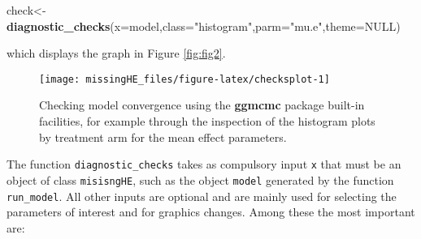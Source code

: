 \documentclass[]{article}
\newenvironment{Shaded}{\begin{snugshade}}{\end{snugshade}}
\newcommand{\KeywordTok}[1]{\textcolor[rgb]{0.13,0.29,0.53}{\textbf{{#1}}}}
\newcommand{\DataTypeTok}[1]{\textcolor[rgb]{0.13,0.29,0.53}{{#1}}}
\newcommand{\StringTok}[1]{\textcolor[rgb]{0.31,0.60,0.02}{{#1}}}
\newcommand{\OtherTok}[1]{\textcolor[rgb]{0.56,0.35,0.01}{{#1}}}
\newcommand{\NormalTok}[1]{{#1}}
\begin{document}
\begin{Shaded}
\begin{Highlighting}[]
\NormalTok{check<-}\KeywordTok{diagnostic_checks}\NormalTok{(}\DataTypeTok{x=}\NormalTok{model,}\DataTypeTok{class=}\StringTok{"histogram"}\NormalTok{,}\DataTypeTok{parm=}\StringTok{"mu.e"}\NormalTok{,}\DataTypeTok{theme=}\OtherTok{NULL}\NormalTok{)}
\end{Highlighting}
\end{Shaded}

which displays the graph in Figure \ref{fig:fig2}.

\begin{figure}[H]

{\centering \texttt{[image: missingHE\_files/figure-latex/checksplot-1]} 

}

\caption{\label{fig:fig2}Checking model convergence using the \textbf{ggmcmc} package built-in facilities, for example through the inspection of the histogram plots by treatment arm for the mean effect parameters.}\label{fig:checksplot}
\end{figure}

The function \texttt{diagnostic\_checks} takes as compulsory input
\texttt{x} that must be an object of class \texttt{misisngHE}, such as
the object \texttt{model} generated by the function \texttt{run\_model}.
All other inputs are optional and are mainly used for selecting the
parameters of interest and for graphics changes. Among these the most
important are:
\end{document}
